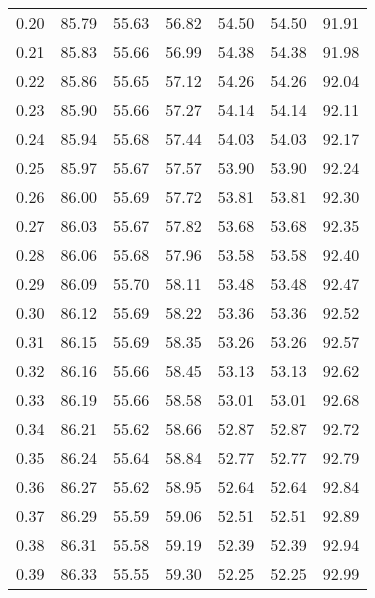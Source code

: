 \begin{tabular}{|c|c|c|c|c|c|c|}
      0.20 &     85.79 &     55.63 &      56.82 &   54.50 &      54.50 &         91.91 \\
      0.21 &     85.83 &     55.66 &      56.99 &   54.38 &      54.38 &         91.98 \\
      0.22 &     85.86 &     55.65 &      57.12 &   54.26 &      54.26 &         92.04 \\
      0.23 &     85.90 &     55.66 &      57.27 &   54.14 &      54.14 &         92.11 \\
      0.24 &     85.94 &     55.68 &      57.44 &   54.03 &      54.03 &         92.17 \\
      0.25 &     85.97 &     55.67 &      57.57 &   53.90 &      53.90 &         92.24 \\
      0.26 &     86.00 &     55.69 &      57.72 &   53.81 &      53.81 &         92.30 \\
      0.27 &     86.03 &     55.67 &      57.82 &   53.68 &      53.68 &         92.35 \\
      0.28 &     86.06 &     55.68 &      57.96 &   53.58 &      53.58 &         92.40 \\
      0.29 &     86.09 &     55.70 &      58.11 &   53.48 &      53.48 &         92.47 \\
      0.30 &     86.12 &     55.69 &      58.22 &   53.36 &      53.36 &         92.52 \\
      0.31 &     86.15 &     55.69 &      58.35 &   53.26 &      53.26 &         92.57 \\
      0.32 &     86.16 &     55.66 &      58.45 &   53.13 &      53.13 &         92.62 \\
      0.33 &     86.19 &     55.66 &      58.58 &   53.01 &      53.01 &         92.68 \\
      0.34 &     86.21 &     55.62 &      58.66 &   52.87 &      52.87 &         92.72 \\
      0.35 &     86.24 &     55.64 &      58.84 &   52.77 &      52.77 &         92.79 \\
      0.36 &     86.27 &     55.62 &      58.95 &   52.64 &      52.64 &         92.84 \\
      0.37 &     86.29 &     55.59 &      59.06 &   52.51 &      52.51 &         92.89 \\
      0.38 &     86.31 &     55.58 &      59.19 &   52.39 &      52.39 &         92.94 \\
      0.39 &     86.33 &     55.55 &      59.30 &   52.25 &      52.25 &         92.99 \\

\end{tabular}
